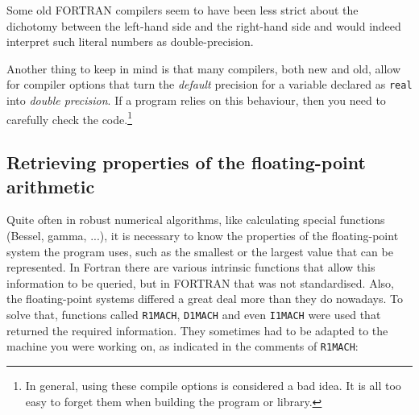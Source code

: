 Some old FORTRAN compilers seem to have been less strict about the dichotomy between
the left-hand side and the right-hand side and would indeed interpret such literal
numbers as double-precision.

Another thing to keep in mind is that many compilers, both new and old, allow for
compiler options that turn the \emph{default} precision for a variable declared as \verb+real+
into \emph{double precision}. If a program relies on this behaviour, then you need to
carefully check the code.\footnote{In general, using these compile options is
considered a bad idea. It is all too easy to forget them when building the program or library.}


\subsection{Retrieving properties of the floating-point arithmetic}
Quite often in robust numerical algorithms, like calculating special functions (Bessel, gamma, ...), it is necessary
to know the properties of the floating-point system the program uses, such as the smallest
or the largest value that can be represented. In Fortran there are various intrinsic functions
that allow this information to be queried, but in FORTRAN that was not standardised. Also,
the floating-point systems differed a great deal more than they do nowadays. To solve that,
functions called \verb+R1MACH+, \verb+D1MACH+ and even \verb+I1MACH+ were used that returned
the required information. They sometimes had to be adapted to the machine you were working
on, as indicated in the comments of \verb+R1MACH+:

